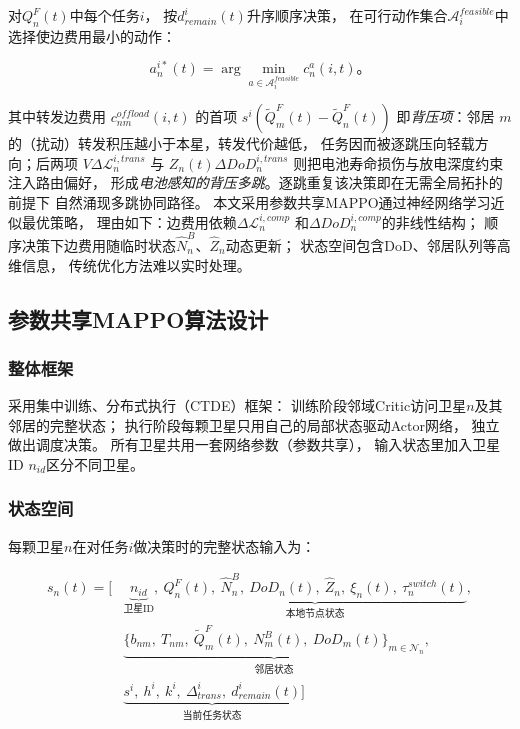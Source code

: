 \documentclass[a4paper,11pt]{article}
\begin{document}
对$Q^F_n(t)$中每个任务$i$，
按$d^i_{remain}(t)$升序顺序决策，
在可行动作集合$\mathcal{A}^{feasible}_i$中选择使边费用最小的动作：

\begin{equation}
a^{i*}_n(t) = \arg\min_{a \in \mathcal{A}^{feasible}_i} c^a_n(i,t)。
\label{eq:scheduling}
\end{equation}

其中转发边费用 $c^{offload}_{nm}(i,t)$ 的首项 $s^i(\tilde{Q}^F_m(t)-\tilde{Q}^F_n(t))$
即\emph{背压项}：邻居 $m$ 的（扰动）转发积压越小于本星，转发代价越低，
任务因而被逐跳压向轻载方向；后两项 $V\Delta\mathcal{L}^{i,trans}_n$ 与
$Z_n(t)\Delta DoD^{i,trans}_n$ 则把电池寿命损伤与放电深度约束注入路由偏好，
形成\emph{电池感知的背压多跳}。逐跳重复该决策即在无需全局拓扑的前提下
自然涌现多跳协同路径。
本文采用参数共享MAPPO通过神经网络学习近似最优策略，
理由如下：边费用依赖$\Delta\mathcal{L}^{i,comp}_n$
和$\Delta DoD^{i,comp}_n$的非线性结构；
顺序决策下边费用随临时状态$\hat{N}^B_n$、$\hat{Z}_n$动态更新；
状态空间包含DoD、邻居队列等高维信息，
传统优化方法难以实时处理。

\subsection{参数共享MAPPO算法设计}

\subsubsection{整体框架}

采用集中训练、分布式执行（CTDE）框架：
训练阶段邻域Critic访问卫星$n$及其邻居的完整状态；
执行阶段每颗卫星只用自己的局部状态驱动Actor网络，
独立做出调度决策。
所有卫星共用一套网络参数（参数共享），
输入状态里加入卫星ID $n_{id}$区分不同卫星。

\subsubsection{状态空间}

每颗卫星$n$在对任务$i$做决策时的完整状态输入为：

\begin{equation}
\begin{aligned}
s_n(t) = \Big[
&\underbrace{n_{id}}_{\text{卫星ID}},\
\underbrace{Q^F_n(t),\ \hat{N}^B_n,\ DoD_n(t),\
\hat{Z}_n,\ \xi_n(t),\ \tau^{switch}_n(t)}_{\text{本地节点状态}}, \\
&\underbrace{\{b_{nm},\ T_{nm},\ \tilde{Q}^F_m(t),\
N^B_m(t),\ DoD_m(t)\}_{m \in \mathcal{N}_n}}_{\text{邻居状态}}, \\
&\underbrace{s^i,\ h^i,\ k^i,\ \Delta^i_{trans},\
d^i_{remain}(t)}_{\text{当前任务状态}}
\Big]
\end{aligned}
\label{eq:state}
\end{equation}
\end{document}
